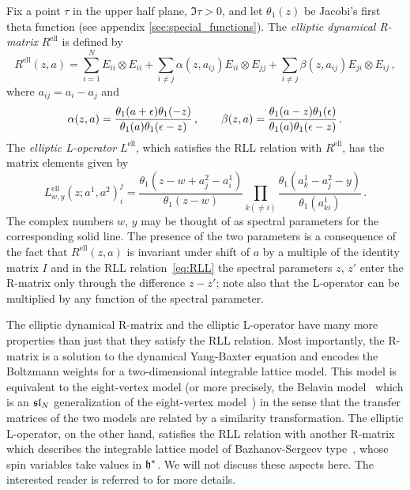 Fix a point $\tau$ in the upper half plane, $\Im\tau > 0$, and let
$\theta_1(z)$ be Jacobi's first theta function (see appendix \ref{sec:special_functions}).
The \emph{elliptic dynamical R-matrix} $R^{\text{ell}}$ is defined
by~\cite{Felder:1994be,Felder:1994pb, MR1645196}
\begin{equation}
  R^{\text{ell}}(z,a)
  =
  \sum_{i=1}^N E_{ii} \otimes E_{ii}
  + \sum_{i \neq j} \alpha(z,a_{ij}) E_{ii} \otimes E_{jj}
  + \sum_{i \neq j} \beta(z,a_{ij}) E_{ji} \otimes E_{ij}
  \,,
\end{equation}
where $a_{ij} = a_i - a_j$ and
\begin{equation}
  \alpha(z,a)
  = \frac{\theta_1(a+\epsilon) \theta_1(-z)}
          {\theta_1(a) \theta_1(\epsilon - z)} \,,
  \qquad
  \beta(z,a)
  = \frac{\theta_1(a - z) \theta_1(\epsilon)}
          {\theta_1(a) \theta_1(\epsilon - z)} \,.
\end{equation}
The \emph{elliptic L-operator} $L^{\text{ell}}$, which satisfies the
RLL relation with $R^{\text{ell}}$, has the matrix elements given
by~\cite{MR1463830}
\begin{equation}
  \label{eq:L-ell}
  L^{\text{ell}}_{w,y}(z; a^1, a^2)^j_i
  =
  \frac{\theta_1(z - w + a^2_j - a^1_i)}{\theta_1(z - w)}
  \prod_{k (\neq i)}
  \frac{\theta_1(a^1_k - a^2_j - y)}{\theta_1(a^1_{ki})}
  \,.
\end{equation}
The complex numbers $w$, $y$ may be thought of as spectral parameters
for the corresponding solid line.  The presence of the two parameters
is a consequence of the fact that $R^{\text{ell}}(z,a)$ is invariant
under shift of $a$ by a multiple of the identity matrix $I$ and in the
RLL relation~\eqref{eq:RLL} the spectral parameters $z$, $z'$ enter
the R-matrix only through the difference $z - z'$; note also that the
L-operator can be multiplied by any function of the spectral
parameter.

The elliptic dynamical R-matrix and the elliptic L-operator have many
more properties than just that they satisfy the RLL relation.  Most
importantly, the R-matrix is a solution to the dynamical Yang-Baxter
equation and encodes the Boltzmann weights for a two-dimensional
integrable lattice model.  This model is equivalent to the
eight-vertex model (or more precisely, the Belavin
model~\cite{Belavin:1981ix} which is an $\mathfrak{sl}_N$ generalization of the
eight-vertex model~\cite{Baxter:1971cr, Baxter:1972hz}) in the sense
that the transfer matrices of the two models are related by a
similarity transformation.  The elliptic L-operator, on the other
hand, satisfies the RLL relation with another R-matrix which describes
the integrable lattice model of Bazhanov-Sergeev
type~\cite{Bazhanov:2010kz, Bazhanov:2011mz}, whose spin variables
take values in $\mathfrak{h}^*$.  We will not discuss these aspects here.
The interested reader is referred to \cite{Yagi:2017hmj} for
more details.






